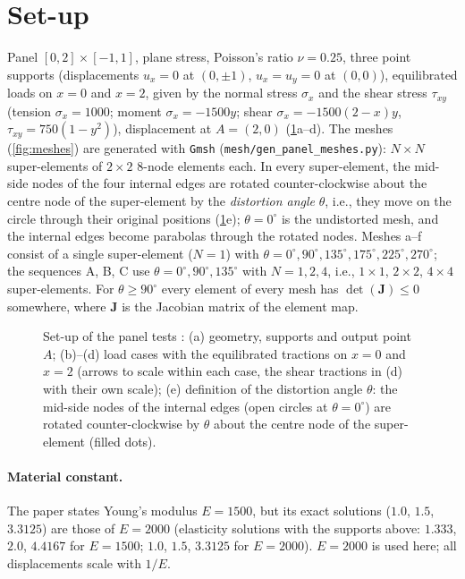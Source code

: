 \documentclass[10pt,a4paper]{article}
\begin{document}
\section{Set-up}\label{sec:setup}
Panel $[0,2]\times[-1,1]$, plane stress, Poisson's ratio $\nu=0.25$, three point supports
(displacements $u_x=0$ at $(0,\pm1)$, $u_x=u_y=0$ at $(0,0)$), equilibrated loads on $x=0$ and
$x=2$, given by the normal stress $\sigma_x$ and the shear stress $\tau_{xy}$ (tension
$\sigma_x=1000$; moment $\sigma_x=-1500y$; shear $\sigma_x=-1500(2-x)y$,
$\tau_{xy}=750(1-y^2)$), displacement at $A=(2,0)$ (\cref{fig:setup}a--d). The meshes
(\cref{fig:meshes}) are generated with \texttt{Gmsh} (\texttt{mesh/gen\_panel\_meshes.py}):
$N\times N$ super-elements of $2\times2$ 8-node elements each. In every super-element, the
mid-side nodes of the four internal edges are rotated counter-clockwise about the centre node
of the super-element by the \emph{distortion angle} $\theta$, i.e., they move on the circle
through their original positions (\cref{fig:setup}e); $\theta=0^\circ$ is the undistorted
mesh, and the internal edges become parabolas through the rotated nodes. Meshes a--f consist of
a single super-element ($N=1$) with
$\theta=0^\circ,90^\circ,135^\circ,175^\circ,225^\circ,270^\circ$; the sequences A, B, C use
$\theta=0^\circ,90^\circ,135^\circ$ with $N=1,2,4$, i.e., $1\times1$, $2\times2$, $4\times4$
super-elements. For $\theta\ge90^\circ$ every element of every mesh has $\det(\bm J)\le0$
somewhere, where $\bm J$ is the Jacobian matrix of the element map.

\begin{figure}[t]
  \centering
  
  \caption{Set-up of the panel tests \citep[Secs.~5.5--5.7]{Rajendran2010technique}:
    (a) geometry, supports and output point $A$; (b)--(d) load cases with the equilibrated
    tractions on $x=0$ and $x=2$ (arrows to scale within each case, the shear tractions in (d)
    with their own scale); (e) definition of the distortion angle $\theta$: the mid-side nodes
    of the internal edges (open circles at $\theta=0^\circ$) are rotated counter-clockwise by
    $\theta$ about the centre node of the super-element (filled dots).}
  \label{fig:setup}
\end{figure}

\paragraph{Material constant.} The paper states Young's modulus $E=1500$, but its exact solutions ($1.0$,
$1.5$, $3.3125$) are those of $E=2000$ (elasticity solutions with the supports above: $1.333$,
$2.0$, $4.4167$ for $E=1500$; $1.0$, $1.5$, $3.3125$ for $E=2000$). $E=2000$ is used here; all
displacements scale with $1/E$.
\end{document}

